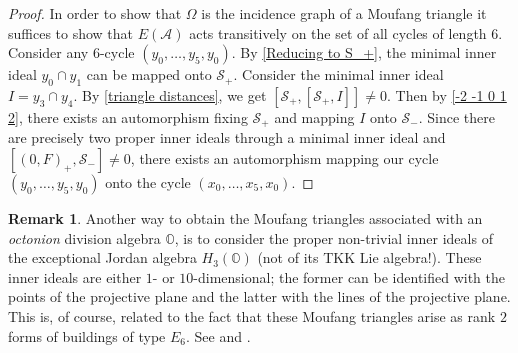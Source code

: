 \documentclass[oneside,a4paper]{amsart} %
\theoremstyle{definition}
\newtheorem{remark}[theorem]{Remark}
\newcommand{\A}{\mathcal{A}}
\renewcommand{\SS}{\mathcal{S}}
\numberwithin{equation}{section}
\begin{document}
\begin{proof}
	In order to show that $\Omega$ is the incidence graph of a Moufang triangle it suffices to show that $E(\A)$ acts transitively on the set of all cycles of length $6$.
	Consider any $6$-cycle $(y_0,\dots,y_5,y_0)$.
	By \cref{Reducing to S_+}, the minimal inner ideal $y_0 \cap y_1$ can be mapped onto $\SS_+$.
	Consider the minimal inner ideal $I = y_3 \cap y_4$.
	By \cref{triangle distances}, we get $[\SS_+,[\SS_+,I]]\neq 0$.
	Then by \cref{-2 -1 0 1 2}, there exists an automorphism fixing $\SS_+$ and mapping $I$ onto $\SS_-$.
	Since there are precisely two proper inner ideals through a minimal inner ideal and $[(0,F)_+,\SS_-]\neq 0$, there exists an automorphism mapping our cycle $(y_0,\dots,y_5,y_0)$ onto the cycle $(x_0,\dots,x_5,x_0)$.
\end{proof}

\begin{remark}
	Another way to obtain the Moufang triangles associated with an \textit{octonion} division algebra $\mathbb O$, is to consider the proper non-trivial inner ideals of the exceptional Jordan algebra $H_3(\mathbb O)$ (not of its TKK Lie algebra!).
	These inner ideals are either $1$- or $10$-dimensional; the former can be identified with the points of the projective plane and the latter with the lines of the projective plane.
	This is, of course, related to the fact that these Moufang triangles arise as rank $2$ forms of buildings of type $E_6$.
	See \cite[2(B)]{Faulkner1973} and \cite[p. 34-35]{McCrimmon2004}.
\end{remark}
\end{document}
